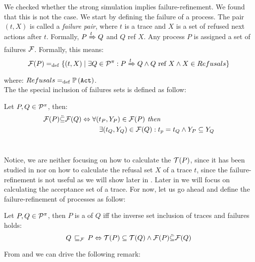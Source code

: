 We checked whether the strong simulation implies failure-refinement. We found that this is not the case. We start by defining the failure of a process.
The pair $(t, X)$ is called a \textit{failure pair}, where $t$ is a trace and $X$ is a set of refused next actions after $t$. Formally, $P \xRightarrow{t} Q$ and $Q$ ref $X$. Any process
$P$ is assigned a set of failures $\Failures[]$. Formally, this means:
\begin{align}
    \Failures[P] \define \{(t,X) \mid \exists Q\in\procs: P \bigstep{t} Q \wedge Q \text{ ref } X \wedge X\in Refusals\}
\end{align}
where: $Refusals =_{\mathrm{def}} \mathbb P\left(\mathtt{Act}\right)$.
\\The the special inclusion of failures sets is defined as follow:
\begin{definition}
\label{def_failure_inclutuion_ref}
Let $P,Q\in\mathcal P^{\pi}$, then:
\begin{equation*}
\begin{aligned}
\Failures[P] \ddot{\subseteq} \Failures[Q] \Leftrightarrow {} & \forall (t_P, Y_P) \in \Failures[P] \textit{ then }\\
      & \ \ \ \exists (t_Q, Y_Q) \in \Failures[Q]: t_p = t_Q \wedge Y_P \subseteq Y_Q
\end{aligned}
\end{equation*}
\ 
\end{definition}
Notice, we are neither focusing on how to calculate the $\Traces[P]$, since it has been studied in \cite{gieseking} nor on how to calculate the refusal set $X$ of a trace $t$, since the failure-refinement is not useful as we will show later in . Later in  we will focus on calculating the acceptance set of a trace.
For now, let us go ahead and define the failure-refinement of \picalc{} processes as follow: 
\begin{definition}
\label{def_failure_ref}
	Let $P,Q\in\mathcal P^{\pi}$, then $P$ is a  of $Q$ iff the inverse set inclusion of traces and failures holds:
   \[Q \refiF P \Leftrightarrow  \Traces[P]\subseteq\Traces[Q] \wedge \Failures[P]\ddot{\subseteq}\Failures[Q]\]
\end{definition}

From  and  we can drive the following remark: 

